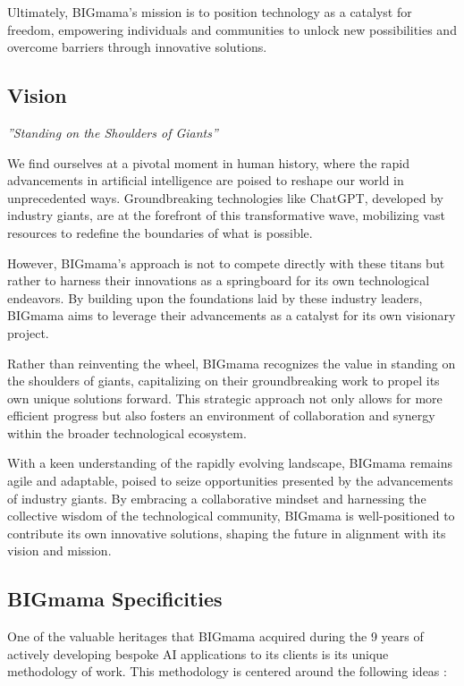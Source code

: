 Ultimately, BIGmama's mission is to position technology as a catalyst for freedom, empowering individuals and communities to unlock new possibilities and overcome barriers through innovative solutions.

\subsection{Vision}

\begin{flushright}
    \small{\it{''Standing on the Shoulders of Giants''}}
\end{flushright}


\noindent We find ourselves at a pivotal moment in human history, where the rapid advancements in artificial intelligence are poised to reshape our world in unprecedented ways. Groundbreaking technologies like ChatGPT, developed by industry giants, are at the forefront of this transformative wave, mobilizing vast resources to redefine the boundaries of what is possible.

However, BIGmama's approach is not to compete directly with these titans but rather to harness their innovations as a springboard for its own technological endeavors. By building upon the foundations laid by these industry leaders, BIGmama aims to leverage their advancements as a catalyst for its own visionary project.

Rather than reinventing the wheel, BIGmama recognizes the value in standing on the shoulders of giants, capitalizing on their groundbreaking work to propel its own unique solutions forward. This strategic approach not only allows for more efficient progress but also fosters an environment of collaboration and synergy within the broader technological ecosystem.

With a keen understanding of the rapidly evolving landscape, BIGmama remains agile and adaptable, poised to seize opportunities presented by the advancements of industry giants. By embracing a collaborative mindset and harnessing the collective wisdom of the technological community, BIGmama is well-positioned to contribute its own innovative solutions, shaping the future in alignment with its vision and mission.

\subsection{BIGmama Specificities} \label{specificities}

One of the valuable heritages that BIGmama acquired during the 9 years of actively developing bespoke AI applications to its clients is its unique methodology of work. This methodology is centered around the following ideas :

